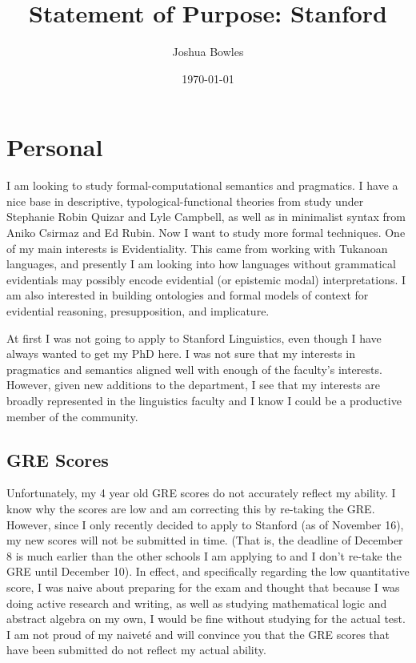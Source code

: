 \documentclass[11pt]{article}
\begin{document}
\author{Joshua Bowles}
\title{Statement of Purpose: Stanford}
\date{\today}


\maketitle
\section{Personal}
I am looking to study formal-computational semantics and pragmatics. I have a nice base in descriptive, typological-functional theories from study under Stephanie Robin Quizar and Lyle Campbell, as well as in minimalist syntax from Aniko Csirmaz and Ed Rubin. Now I want to study more formal techniques. One of my main interests is Evidentiality. This came from working with Tukanoan languages, and presently I am looking into how languages without grammatical evidentials may possibly encode evidential (or epistemic modal) interpretations. I am also interested in building ontologies and formal models of context for evidential reasoning, presupposition, and implicature. 

At first I was not going to apply to Stanford Linguistics, even though I have always wanted to get my PhD here. I was not sure that my interests in pragmatics and semantics aligned well with enough of the faculty's interests. However, given new additions to the department, I see that my interests are broadly represented in the linguistics faculty and I know I could be a productive member of the community. 

\subsection{GRE Scores}
Unfortunately, my 4 year old GRE scores do not accurately reflect my ability. I know why the scores are low and am correcting this by re-taking the GRE. However, since I only recently decided to apply to Stanford (as of November 16), my new scores will not be submitted in time. (That is, the deadline of December 8 is much earlier than the other schools I am applying to and I don't re-take the GRE until December 10). In effect, and specifically regarding the low quantitative score, I was naive about preparing for the exam and thought that because I was doing active research and writing, as well as studying mathematical logic and abstract algebra on my own, I would be fine without studying for the actual test. I am not proud of my naivet\'e and will convince you that the GRE scores that have been submitted do not reflect my actual ability.
\end{document}
